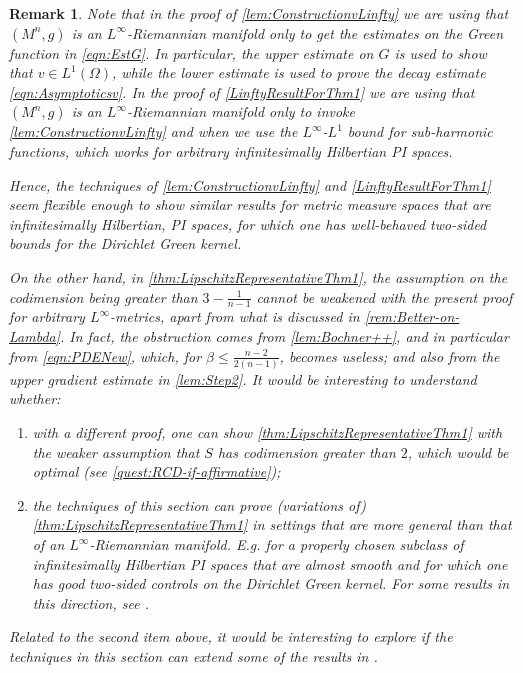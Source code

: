\documentclass[12pt,a4paper,reqno]{amsart}
\newtheorem{remark}[theorem]{Remark}
\renewcommand{\leq}{\leqslant}
\begin{document}
\begin{remark}\label{rem:PossiblyMoreGeneralResults}
   Note that  in the proof of \cref{lem:ConstructionvLinfty} we are using that $(M^n,g)$ is an $L^\infty$-Riemannian manifold only to get the estimates on the Green function in \eqref{eqn:EstG}. In particular, the upper estimate on $G$ is used to show that $v\in L^1(\Omega)$, while the lower estimate is used to prove the decay estimate \eqref{eqn:Asymptoticsv}. In the proof of \cref{LinftyResultForThm1} we are using that $(M^n,g)$ is an $L^\infty$-Riemannian manifold only to invoke \cref{lem:ConstructionvLinfty} and when we use the $L^\infty$-$L^1$ bound for sub-harmonic functions, which works for arbitrary infinitesimally Hilbertian PI spaces.
   
   Hence, the techniques of \cref{lem:ConstructionvLinfty} and \cref{LinftyResultForThm1} seem flexible enough to show similar results for metric measure spaces that are infinitesimally Hilbertian, PI spaces, for which one has well-behaved two-sided bounds for the Dirichlet Green kernel. 

   On the other hand, in \cref{thm:LipschitzRepresentativeThm1}, the assumption on the codimension being greater than $3-\frac{1}{n-1}$ cannot be weakened with the present proof for arbitrary $L^\infty$-metrics, apart from what is discussed in \cref{rem:Better-on-Lambda}. In fact, the obstruction comes from \cref{lem:Bochner++}, and in particular from \eqref{eqn:PDENew}, which, for $\beta\leq \frac{n-2}{2(n-1)}$, becomes useless; and also from  the upper gradient estimate in \cref{lem:Step2}. It would be interesting to understand whether:
   \begin{enumerate}
       \item with a different proof, one can show \cref{thm:LipschitzRepresentativeThm1} with the weaker assumption that $S$ has codimension greater than $2$, which would be optimal (see \cref{quest:RCD-if-affirmative});
       \item the techniques of this section can prove (variations of) \cref{thm:LipschitzRepresentativeThm1} in settings that are more general than that of an $L^\infty$-Riemannian manifold. E.g. for a properly chosen subclass of infinitesimally Hilbertian PI spaces that are almost smooth and for which one has good two-sided controls on the Dirichlet Green kernel. For some results in this direction, see \cite[Section 6]{BZ26}.
   \end{enumerate}
   Related to the second item above, it would be interesting to explore if the techniques in this section can extend some of the results in \cite{HondaSun}.
\end{remark}
\end{document}
